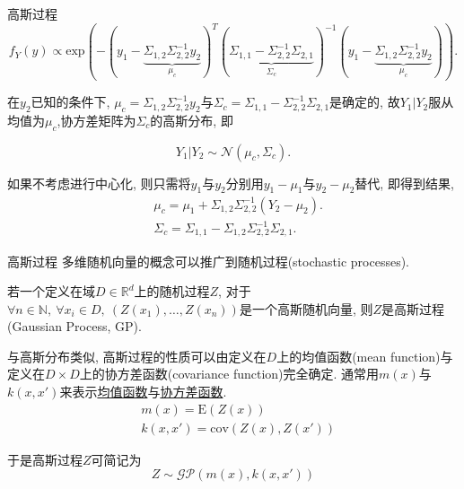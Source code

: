 \documentclass[10pt,mathserif]{beamer}
\theoremstyle{definition}
\numberwithin{equation}{section} %
\begin{document}
    \begin{frame}[fragile]{高斯过程}
        $$f_{Y}(y)\propto\mathrm{exp}\left(-(y_{1}-\underbrace{\Sigma_{1,2}\Sigma^{-1}_{2,2}y_{2}}_{\mu_{c}})^{T}(\underbrace{\Sigma_{1,1}-\Sigma^{-1}_{2,2}\Sigma_{2,1}}_{\Sigma_{c}})^{-1}(y_{1}-\underbrace{\Sigma_{1,2}\Sigma^{-1}_{2,2}y_{2}}_{\mu_{c}})\right).$$

        在$y_{2}$已知的条件下, $\mu_{c}=\Sigma_{1,2}\Sigma^{-1}_{2,2}y_{2}$与$\Sigma_{c}=\Sigma_{1,1}-\Sigma^{-1}_{2,2}\Sigma_{2,1}$是确定的, 故$Y_{1}|Y_{2}$服从均值为$\mu_{c}$,协方差矩阵为$\Sigma_{c}$的高斯分布, 即

        $$Y_{1}|Y_{2}\sim\mathcal{N}(\mu_{c},\Sigma_{c}).$$

        如果不考虑进行中心化, 则只需将$y_{1}$与$y_{2}$分别用$y_{1}-\mu_{1}$与$y_{2}-\mu_{2}$替代, 即得到结果,
        \begin{align*}
            &\mu_{c}=\mu_{1}+\Sigma_{1,2}\Sigma_{2,2}^{-1}(Y_{2}-\mu_{2}). \\
            &\Sigma_{c}=\Sigma_{1,1}-\Sigma_{1,2}\Sigma^{-1}_{2,2}\Sigma_{2,1}.
        \end{align*}
        \rightline{$\square$} %
    \end{frame}

    \begin{frame}[fragile]{高斯过程}
        多维随机向量的概念可以推广到随机过程(stochastic processes).
    
        \begin{definition}[高斯过程]
            \vspace{2ex}  
            若一个定义在域$D\in\mathds{R}^{d}$上的随机过程$Z$, 对于$\forall n\in \mathds{N},\ \forall x_{i}\in D,\ (Z(x_{1}),\dots,Z(x_{n}))$是一个高斯随机向量, 则$Z$是高斯过程(Gaussian Process, GP).
        \end{definition}

        与高斯分布类似, 高斯过程的性质可以由定义在$D$上的均值函数(mean function)与定义在$D\times D$上的协方差函数(covariance function)完全确定. 通常用$m(x)$与$k(x,x')$来表示\uline{均值函数}与\uline{协方差函数}. 
        \begin{align}
            &m(x)=\mathrm{E}(Z(x)) \\
            &k(x,x')=\mathrm{cov}(Z(x),Z(x'))
        \end{align}
        
        于是高斯过程$Z$可简记为
        \begin{equation*}
            Z\sim\mathcal{GP}\left(m(x),k(x,x')\right)
        \end{equation*}

    \end{frame}
\end{document}

